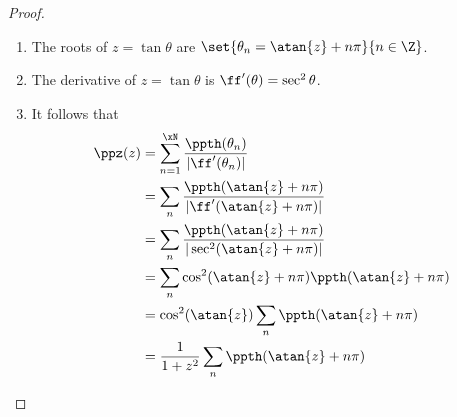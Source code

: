 \begin{proof}
    \begin{enumerate}
      \item The roots of $z=\tan\theta$ are $\set{\theta_n=\atan{z}+n\pi}{n\in\Z}$. \label{item:ppztan_roots}
      \item The derivative of $z=\tan\theta$ is  $\ff'(\theta)=\sec^2 \theta$. \label{item:ppztan_derivative}
      \item It follows that
        \begin{align*}
          \ppz(z)
            &= \sum_{n=1}^\xN \frac{\ppth(\theta_n)}{|\ff'(\theta_n)|}
          \\&= \sum_n \frac{\ppth(\atan{z}+n\pi)}{|\ff'(\atan{z}+n\pi)|}
          \\&= \sum_n \frac{\ppth(\atan{z}+n\pi)}{|\sec^2(\atan{z}+n\pi)|}
          \\&= \sum_n \cos^2(\atan{z}+n\pi)  \ppth(\atan{z}+n\pi)
          \\&= \cos^2(\atan{z}) \sum_n  \ppth(\atan{z}+n\pi)
          \\&= \frac{1}{1+z^2}  \sum_n \ppth(\atan{z}+n\pi)
        \end{align*}
    \end{enumerate}


\end{proof}
